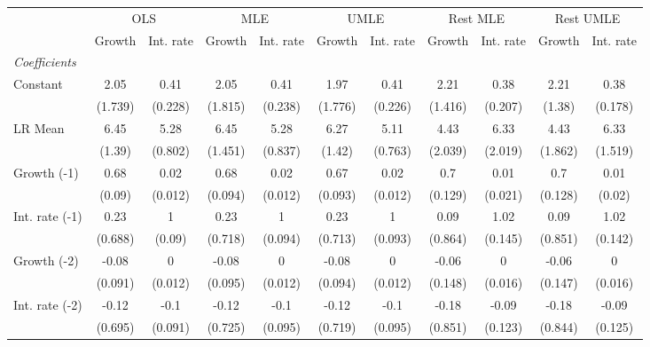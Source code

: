 \begin{table}[htbp] 
	\centering
	\begin{tabular}{@{\extracolsep{4pt}}lcccccccccc@{}}		\hline\hline
		 		 & \multicolumn{2}{c}{OLS} &\multicolumn{2}{c}{MLE} &\multicolumn{2}{c}{UMLE} &\multicolumn{2}{c}{Rest MLE} &\multicolumn{2}{c}{Rest UMLE} \\ 
 		 & Growth 	 & Int. rate 	 & Growth 	 & Int. rate 	 & Growth 	 & Int. rate 	 & Growth 	 & Int. rate 	 & Growth 	 & Int. rate\\\cline{2-3}\cline{4-5}\cline{6-7}\cline{8-9}\cline{10-11}
\rule{0pt}{4ex} 
 \emph{Coefficients} 	  		 & 		 & 		 & 		 & 		 & 		 & 		 & 		 & 		 & 		 &\\ 
\quad Constant 	 & 2.05 	 & 0.41 	 & 2.05 	 & 0.41 	 & 1.97 	 & 0.41 	 & 2.21 	 & 0.38 	 & 2.21 	 & 0.38	 \\ 
 		 & (1.739) 	 & (0.228) 	 & (1.815) 	 & (0.238) 	 & (1.776) 	 & (0.226) 	 & (1.416) 	 & (0.207) 	 & (1.38) 	 & (0.178) 	 \\ 
\quad LR Mean 	 & 6.45 	 & 5.28 	 & 6.45 	 & 5.28 	 & 6.27 	 & 5.11 	 & 4.43 	 & 6.33 	 & 4.43 	 & 6.33	 \\ 
 		 & (1.39) 	 & (0.802) 	 & (1.451) 	 & (0.837) 	 & (1.42) 	 & (0.763) 	 & (2.039) 	 & (2.019) 	 & (1.862) 	 & (1.519) 	 \\ 
\quad Growth (-1) 	 &0.68 	 & 0.02 	 & 0.68 	 & 0.02 	 & 0.67 	 & 0.02 	 & 0.7 	 & 0.01 	 & 0.7 	 & 0.01	 \\ 
 		 & (0.09) 	 & (0.012) 	 & (0.094) 	 & (0.012) 	 & (0.093) 	 & (0.012) 	 & (0.129) 	 & (0.021) 	 & (0.128) 	 & (0.02) 	 \\ 
\quad Int. rate (-1) 	 &0.23 	 & 1 	 & 0.23 	 & 1 	 & 0.23 	 & 1 	 & 0.09 	 & 1.02 	 & 0.09 	 & 1.02	 \\ 
 		 & (0.688) 	 & (0.09) 	 & (0.718) 	 & (0.094) 	 & (0.713) 	 & (0.093) 	 & (0.864) 	 & (0.145) 	 & (0.851) 	 & (0.142) 	 \\ 
\quad Growth (-2) 	 &-0.08 	 & 0 	 & -0.08 	 & 0 	 & -0.08 	 & 0 	 & -0.06 	 & 0 	 & -0.06 	 & 0	 \\ 
 		 & (0.091) 	 & (0.012) 	 & (0.095) 	 & (0.012) 	 & (0.094) 	 & (0.012) 	 & (0.148) 	 & (0.016) 	 & (0.147) 	 & (0.016) 	 \\ 
\quad Int. rate (-2) 	 &-0.12 	 & -0.1 	 & -0.12 	 & -0.1 	 & -0.12 	 & -0.1 	 & -0.18 	 & -0.09 	 & -0.18 	 & -0.09	 \\ 
 		 & (0.695) 	 & (0.091) 	 & (0.725) 	 & (0.095) 	 & (0.719) 	 & (0.095) 	 & (0.851) 	 & (0.123) 	 & (0.844) 	 & (0.125) 	 \\ 

\end{tabular}
\end{table}
